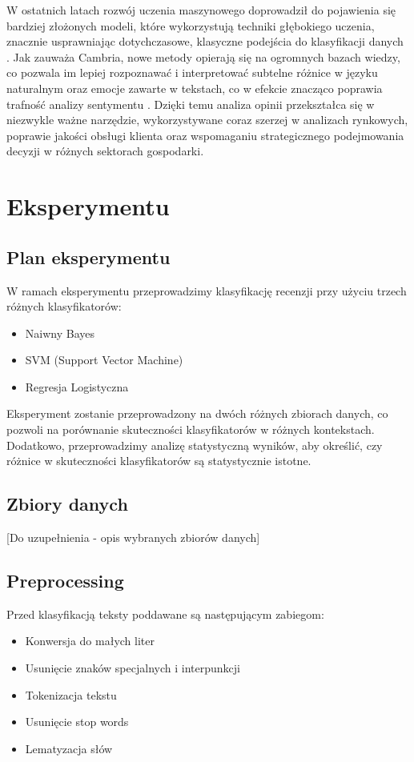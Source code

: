 \documentclass[runningheads]{llncs}
\begin{document}
W ostatnich latach rozwój uczenia maszynowego doprowadził do pojawienia się bardziej złożonych modeli, które wykorzystują techniki głębokiego uczenia, znacznie usprawniając dotychczasowe, klasyczne podejścia do klasyfikacji danych \cite{10.1155/2016/6965725}\cite{10.30534/ijeter/2020/46822020}. Jak zauważa Cambria, nowe metody opierają się na ogromnych bazach wiedzy, co pozwala im lepiej rozpoznawać i interpretować subtelne różnice w języku naturalnym oraz emocje zawarte w tekstach, co w efekcie znacząco poprawia trafność analizy sentymentu \cite{10.1109/mis.2013.30}. Dzięki temu analiza opinii przekształca się w niezwykle ważne narzędzie, wykorzystywane coraz szerzej w analizach rynkowych, poprawie jakości obsługi klienta oraz wspomaganiu strategicznego podejmowania decyzji w różnych sektorach gospodarki.

\section{Eksperymentu}
\subsection{Plan eksperymentu}
W ramach eksperymentu przeprowadzimy klasyfikację recenzji przy użyciu trzech różnych klasyfikatorów:
\begin{itemize}
    \item Naiwny Bayes
    \item SVM (Support Vector Machine)
    \item Regresja Logistyczna
\end{itemize}

Eksperyment zostanie przeprowadzony na dwóch różnych zbiorach danych, co pozwoli na porównanie skuteczności klasyfikatorów w różnych kontekstach. Dodatkowo, przeprowadzimy analizę statystyczną wyników, aby określić, czy różnice w skuteczności klasyfikatorów są statystycznie istotne.

\subsection{Zbiory danych}
[Do uzupełnienia - opis wybranych zbiorów danych]

\subsection{Preprocessing}
Przed klasyfikacją teksty poddawane są następującym zabiegom:
\begin{itemize}
    \item Konwersja do małych liter
    \item Usunięcie znaków specjalnych i interpunkcji
    \item Tokenizacja tekstu
    \item Usunięcie stop words
    \item Lematyzacja słów
\end{itemize}
\end{document}

